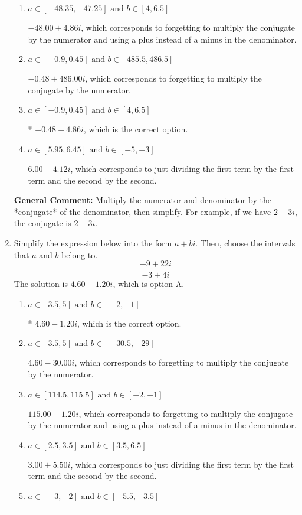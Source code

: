 \documentclass{extbook}[14pt]
\newcommand{\litem}[1]{\item #1

\rule{\textwidth}{0.4pt}}
\begin{document}
\begin{enumerate}
{\begin{enumerate}[label=\Alph*.]
 $4.80  - 0.90 i$, which corresponds to forgetting to multiply the conjugate by the numerator and not computing the conjugate correctly.
\item \( a \in [-48.35, -47.25] \text{ and } b \in [4, 6.5] \)

 $-48.00  + 4.86 i$, which corresponds to forgetting to multiply the conjugate by the numerator and using a plus instead of a minus in the denominator.
\item \( a \in [-0.9, 0.45] \text{ and } b \in [485.5, 486.5] \)

 $-0.48  + 486.00 i$, which corresponds to forgetting to multiply the conjugate by the numerator.
\item \( a \in [-0.9, 0.45] \text{ and } b \in [4, 6.5] \)

* $-0.48  + 4.86 i$, which is the correct option.
\item \( a \in [5.95, 6.45] \text{ and } b \in [-5, -3] \)

 $6.00  - 4.12 i$, which corresponds to just dividing the first term by the first term and the second by the second.
\end{enumerate}

\textbf{General Comment:} Multiply the numerator and denominator by the *conjugate* of the denominator, then simplify. For example, if we have $2+3i$, the conjugate is $2-3i$.
}
\litem{
Simplify the expression below into the form $a+bi$. Then, choose the intervals that $a$ and $b$ belong to.
\[ \frac{-9 + 22 i}{-3 + 4 i} \]The solution is \( 4.60  - 1.20 i \), which is option A.\begin{enumerate}[label=\Alph*.]
\item \( a \in [3.5, 5] \text{ and } b \in [-2, -1] \)

* $4.60  - 1.20 i$, which is the correct option.
\item \( a \in [3.5, 5] \text{ and } b \in [-30.5, -29] \)

 $4.60  - 30.00 i$, which corresponds to forgetting to multiply the conjugate by the numerator.
\item \( a \in [114.5, 115.5] \text{ and } b \in [-2, -1] \)

 $115.00  - 1.20 i$, which corresponds to forgetting to multiply the conjugate by the numerator and using a plus instead of a minus in the denominator.
\item \( a \in [2.5, 3.5] \text{ and } b \in [3.5, 6.5] \)

 $3.00  + 5.50 i$, which corresponds to just dividing the first term by the first term and the second by the second.
\item \( a \in [-3, -2] \text{ and } b \in [-5.5, -3.5] \)


\end{enumerate}}
\end{enumerate}
\end{document}
